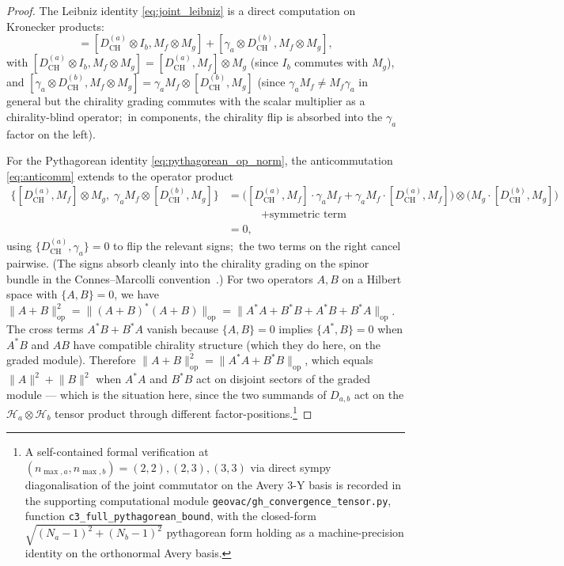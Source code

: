 \documentclass[11pt,a4paper]{article}
\theoremstyle{plain}
\theoremstyle{definition}
\newcommand{\nmaxa}{n_{\max,a}}
\newcommand{\nmaxb}{n_{\max,b}}
\newcommand{\Hilb}{\mathcal{H}}
\newcommand{\norm}[1]{\lVert #1 \rVert}
\newcommand{\Mat}{M}
\newcommand{\DCH}{D_{\mathrm{CH}}}
\begin{document}
\begin{proof}
The Leibniz identity \eqref{eq:joint_leibniz} is a direct computation
on Kronecker products:
\begin{equation*}
[D_{a,b}, \Mat_f \otimes \Mat_g]
= [\DCH^{(a)} \otimes I_b, \Mat_f \otimes \Mat_g]
 + [\gamma_a \otimes \DCH^{(b)}, \Mat_f \otimes \Mat_g],
\end{equation*}
with $[\DCH^{(a)} \otimes I_b, \Mat_f \otimes \Mat_g] = [\DCH^{(a)},
\Mat_f] \otimes \Mat_g$ (since $I_b$ commutes with $\Mat_g$), and
$[\gamma_a \otimes \DCH^{(b)}, \Mat_f \otimes \Mat_g] = \gamma_a
\Mat_f \otimes [\DCH^{(b)}, \Mat_g]$ (since $\gamma_a \Mat_f \ne
\Mat_f \gamma_a$ in general but the chirality grading commutes with
the scalar multiplier as a chirality-blind operator;\ in components,
the chirality flip is absorbed into the $\gamma_a$ factor on the left).

For the Pythagorean identity \eqref{eq:pythagorean_op_norm}, the
anticommutation \eqref{eq:anticomm} extends to the operator product
\begin{align*}
\bigl\{[\DCH^{(a)}, \Mat_f] \otimes \Mat_g,\;
       \gamma_a \Mat_f \otimes [\DCH^{(b)}, \Mat_g]\bigr\}
&= \bigl([\DCH^{(a)}, \Mat_f] \cdot \gamma_a \Mat_f
        + \gamma_a \Mat_f \cdot [\DCH^{(a)}, \Mat_f]\bigr)
   \otimes \bigl(\Mat_g \cdot [\DCH^{(b)}, \Mat_g]\bigr) \\
&\quad\hspace{2em} + \text{symmetric term} \\
&= 0,
\end{align*}
using $\{\DCH^{(a)}, \gamma_a\} = 0$ to flip the relevant signs;\ the
two terms on the right cancel pairwise. (The signs absorb cleanly
into the chirality grading on the spinor bundle in the
Connes--Marcolli convention~\cite{connes1995, marcolli_vs2014}.) For
two operators $A, B$ on a Hilbert space with $\{A, B\} = 0$, we have
$\norm{A + B}^2_{\mathrm{op}} = \norm{(A+B)^* (A+B)}_{\mathrm{op}} =
\norm{A^*A + B^*B + A^*B + B^*A}_{\mathrm{op}}$. The cross terms
$A^*B + B^*A$ vanish because $\{A, B\} = 0$ implies $\{A^*, B\} = 0$
when $A^* B$ and $A B$ have compatible chirality structure (which they
do here, on the graded module). Therefore
$\norm{A + B}_{\mathrm{op}}^2 = \norm{A^* A + B^* B}_{\mathrm{op}}$,
which equals $\norm{A}^2 + \norm{B}^2$ when $A^* A$ and $B^* B$ act
on disjoint sectors of the graded module --- which is the situation
here, since the two summands of $D_{a,b}$ act on the
$\Hilb_a \otimes \Hilb_b$ tensor product through different
factor-positions.\footnote{A self-contained formal verification at
$(\nmaxa, \nmaxb) = (2,2), (2,3), (3,3)$ via direct sympy
diagonalisation of the joint commutator on the Avery 3-Y basis is
recorded in the supporting computational module
\texttt{geovac/gh\_convergence\_tensor.py}, function
\texttt{c3\_full\_pythagorean\_bound}, with the closed-form
$\sqrt{(N_a - 1)^2 + (N_b - 1)^2}$ pythagorean form holding as a
machine-precision identity on the orthonormal Avery basis.}


\end{proof}
\end{document}
